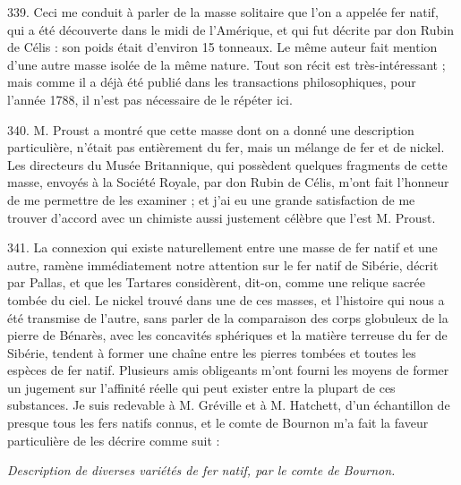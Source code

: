 \documentclass[a4paper, 11pt, oneside, polutonikogreek, french]{article}
\begin{document}
339. Ceci me conduit à parler de la masse solitaire que l'on a appelée fer natif, qui a été découverte dans le midi de l'Amérique, et qui fut décrite par don Rubin de Célis : son poids était d'environ 15 tonneaux. Le même auteur fait mention d'une autre masse isolée de la même nature. Tout son récit est très-intéressant ; mais comme il a déjà été publié dans les transactions philosophiques, pour l'année 1788, il n'est pas nécessaire de le répéter ici.

340. M. Proust a montré que cette masse dont on a donné une description particulière, n'était pas entièrement du fer, mais un mélange de fer et de nickel. Les directeurs du Musée Britannique, qui possèdent quelques fragments de cette masse, envoyés à la Société Royale, par don Rubin de Célis, m'ont fait l'honneur de me permettre de les examiner ; et j'ai eu une grande satisfaction de me trouver d'accord avec un chimiste aussi justement célèbre que l'est M. Proust.

341. La connexion qui existe naturellement entre une masse de fer natif et une autre, ramène immédiatement notre attention sur le fer natif de Sibérie, décrit par Pallas, et que les Tartares considèrent, dit-on, comme une relique sacrée tombée du ciel. Le nickel trouvé dans une de ces masses, et l'histoire qui nous a été transmise de l'autre, sans parler de la comparaison des corps globuleux de la pierre de Bénarès, avec les concavités sphériques et la matière terreuse du fer de Sibérie, tendent à former une chaîne entre les pierres tombées et toutes les espèces de fer natif. Plusieurs amis obligeants m'ont fourni les moyens de former un jugement sur l'affinité réelle qui peut exister entre la plupart de ces substances. Je suis redevable à M. Gréville et à M. Hatchett, d'un échantillon de presque tous les fers natifs connus, et le comte de Bournon m'a fait la faveur particulière de les décrire comme suit :

\begin{center}
\emph{Description de diverses variétés de fer natif, par le comte de Bournon.}
\end{center}
\end{document}
